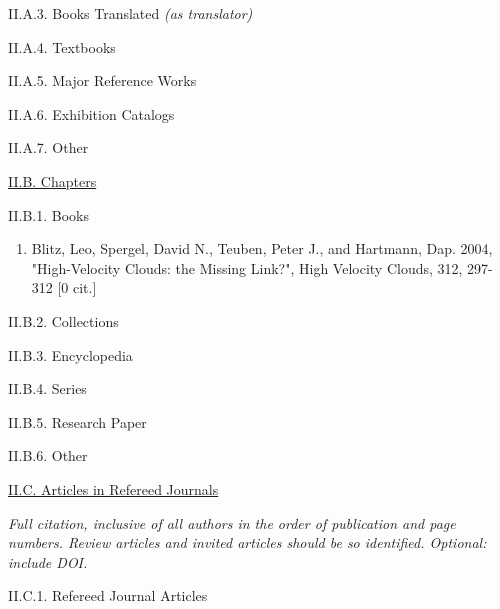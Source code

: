 \documentclass[11pt,letterpaper]{article}
\begin{document}
II.A.3. Books Translated \textit{(as translator)}

II.A.4. Textbooks

II.A.5. Major Reference Works

II.A.6. Exhibition Catalogs

II.A.7. Other


\underline{II.B. Chapters}

II.B.1. Books

\begin{enumerate}[resume,label=\textbf{\arabic*}.]  
\item
Blitz, Leo, Spergel, David N., Teuben, Peter J., and Hartmann, Dap.  2004,  
"High-Velocity Clouds: the Missing Link?", High Velocity Clouds,  312,  
297-312 [0 cit.] 
\end{enumerate}

II.B.2. Collections

II.B.3. Encyclopedia

II.B.4. Series

II.B.5. Research Paper

II.B.6. Other


\underline{II.C. Articles in Refereed Journals}

\textit{Full citation, inclusive of all authors in the order of publication and page numbers. Review articles and invited articles should be so identified. Optional: include DOI.}

II.C.1. Refereed Journal Articles

\end{document}
